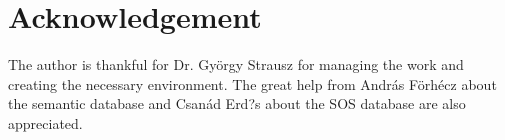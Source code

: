 \chapter*{Acknowledgement}

The author is thankful for Dr. György Strausz for managing the work and creating the necessary environment. The great help from András Förhécz about the semantic database and Csanád Erd?s about the SOS database are also appreciated.